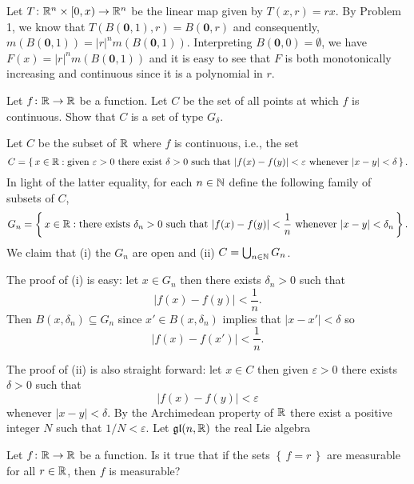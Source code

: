 \begin{solution}
  Let \(T\colon\mathbb{R}^n\times[0,x)\to\mathbb{R}^n\) be the linear map given by
  \(T(x,r)=rx\). By Problem 1, we know that
  \(T(B(\mathbf{0},1),r)=B(\mathbf{0},r)\) and consequently,
  \(m(B(\mathbf{0},1))=|r|^nm(B(\mathbf{0},1))\). Interpreting
  \(B(\mathbf{0},0)=\emptyset\), we have \(F(x)=|r|^nm(B(\mathbf{0},1))\)
  and it is easy to see that \(F\) is both monotonically increasing and
  continuous since it is a polynomial in \(r\).
\end{solution}

\begin{problem}
  Let \(f\colon\mathbb{R}\to\mathbb{R}\) be a function. Let \(C\) be the set of all
  points at which \(f\) is continuous. Show that \(C\) is a set of type
  \(G_\delta\).
\end{problem}
\begin{solution}
  Let \(C\) be the subset of \(\mathbb{R}\) where \(f\) is continuous, i.e., the
  set
  \[
    C=\left\{\,x\in\mathbb{R}:\text{given \(\varepsilon>0\) there exist
        \(\delta>0\) such that \(|f(x)-f(y)|<\varepsilon\) whenever
      \(|x-y|<\delta\)}\,\right\}.
  \]
  In light of the latter equality, for each \(n\in\mathbb{N}\) define the
  following family of subsets of \(C\),
  \[
    G_n=\left\{\,x\in\mathbb{R}:\text{there exists \(\delta_n>0\) such that
        \(|f(x)-f(y)|<\frac{1}{n}\) whenever \(|x-y|<\delta_n\)}\,\right\}.
  \]
  We claim that (i) the \(G_n\) are open and (ii)
  \(C=\bigcup_{n\in\mathbb{N}}G_n\).

  The proof of (i) is easy: let \(x\in G_n\) then there exists
  \(\delta_n>0\) such that
  \[
    |f(x)-f(y)|<\frac{1}{n}.
  \]
  Then $B(x,\delta_n)\subseteq G_n$ since \(x'\in B(x,\delta_n)\) implies
  that \(|x-x'|<\delta\) so
  \[
    |f(x)-f(x')|<\frac{1}{n}.
  \]

  The proof of (ii) is also straight forward: let \(x\in C\) then given
  \(\varepsilon>0\) there exists \(\delta>0\) such that
  \[
    |f(x)-f(y)|<\varepsilon
  \]
  whenever \(|x-y|<\delta\). By the Archimedean property of \(\mathbb{R}\) there
  exist a positive integer \(N\) such that \(1/N<\varepsilon\). Let
  $\mathfrak{gl}(n,\mathbb{R})$ the real Lie algebra
\end{solution}

\begin{problem}
  Let \(f\colon\mathbb{R}\to\mathbb{R}\) be a function. Is it true that if the sets
  \(\left\{\,f=r\,\right\}\) are measurable for all \(r\in\mathbb{R}\), then
  \(f\) is measurable?
\end{problem}
\begin{solution}
\end{solution}

